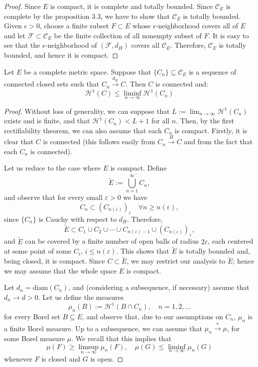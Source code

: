 \documentclass[12pt]{article}
\begin{document}
{\begin{proof}
    Since $E$ is compact, it is complete and totally bounded. Since $\mathcal{C}_E$ is complete by the proposition 3.3, we have to show that $\mathcal{C}_E$ is totally bounded. Given $\epsilon > 0$, choose a finite subset $F \subset E$ whose $\epsilon$-neighborhood covers all of $E$ and let $\mathcal{F} \subset \mathcal{C}_E$ be the finite collection of all nonempty subset of $F$. It is easy to see that the $\epsilon$-neighborhood of $(\mathcal{F},d_H)$ covers all $\mathcal{C}_E$. Therefore, $\mathcal{C}_E$ is totally bounded, and hence it is compact.
\end{proof}

\begin{theorem}[Golab]
    Let $E$ be a complete metric space. Suppose that $\{C_n\} \subseteq \mathcal{C}_E$ is a sequence of connected closed sets such that $C_n \xrightarrow{d_H} C$. Then $C$ is connected and:$$\mathcal{H}^1(C) \leqslant \liminf_{n \to \infty} \mathcal{H}^1(C_n)$$
\end{theorem}

\begin{proof}

Without loss of generality, we can suppose that $L :=
\lim_{n \to \infty} \mathcal{H}^1(C_n)$ exists and is finite, and that $\mathcal{H}^1(C_n) < L + 1$ for all $n$.
Then, by the first rectifiability theorem, we can also assume that each $C_n$ is compact.
Firstly, it is clear that $C$ is connected (this follows easily from $C_n \xrightarrow{H} C$
and from the fact that each $C_n$ is connected).

\indent Let us reduce to the case where $E$ is compact. Define
\[
    \tilde{E} := \overline{\bigcup_{n=1}^{\infty} C_n},
\]
and observe that for every small $\varepsilon > 0$ we have
\[
    C_n \subset \left(C_{n(\varepsilon)}\right)_{\varepsilon} \quad \forall n \geqslant n(\varepsilon),
\]
since $\{C_n\}$ is Cauchy with respect to $d_H$. Therefore,
\[
    \tilde{E} \subset C_1 \cup C_2 \cup \cdots \cup C_{n(\varepsilon)-1} \cup \left(C_{n(\varepsilon)}\right)_{\varepsilon},
\]
and $\tilde{E}$ can be covered by a finite number of open balls of radius $2\varepsilon$,
each centered at some point of some $C_i$, $i \leqslant n(\varepsilon)$. This shows that $\tilde{E}$
is totally bounded and, being closed, it is compact. Since $C \subset \tilde{E}$, we
may restrict our analysis to $\tilde{E}$; hence we may assume that the whole
space $E$ is compact.

Let $d_n = \mathrm{diam}(C_n)$, and (considering a subsequence, if necessary)
assume that $d_n \to d > 0$. Let us define the measures
\[
    \mu_n(B) := \mathcal{H}^1(B \cap C_n), \quad n = 1, 2, \ldots
\]
for every Borel set $B \subseteq E$, and observe that, due to our assumptions on
$C_n$, $\mu_n$ is a finite Borel measure. Up to a subsequence, we can assume
that $\mu_n \xrightarrow{*} \mu$, for some Borel measure $\mu$. We recall that this implies
that
\[
    \mu(F) \geqslant \limsup_{n \to \infty} \mu_n(F), \quad \mu(G) \leqslant \liminf_{n \to \infty} \mu_n(G)
\]
whenever $F$ is closed and $G$ is open.


\end{proof}}
\end{document}

